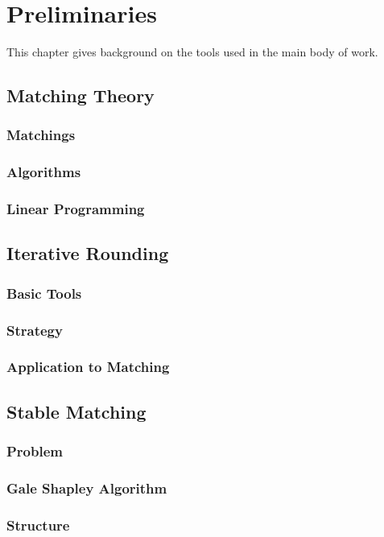 \chapter{Preliminaries}
This chapter gives background on the tools used in the main body of work.

\section{Matching Theory}
\subsection{Matchings}
\subsection{Algorithms}
\subsection{Linear Programming}
\section{Iterative Rounding}
\subsection{Basic Tools}
\subsection{Strategy}
\subsection{Application to Matching}
\section{Stable Matching}
\subsection{Problem}
\subsection{Gale Shapley Algorithm}
\subsection{Structure}
